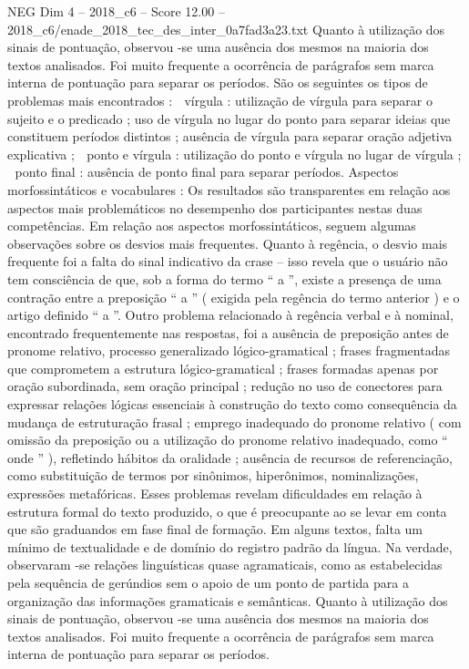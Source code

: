 \begin{textsample}{NEG Dim 4 – 2018\_c6 – Score 12.00 – 2018\_c6/enade\_2018\_tec\_des\_inter\_0a7fad3a23.txt}
Quanto à utilização dos sinais de pontuação, observou -se uma ausência dos mesmos na maioria dos textos analisados.
Foi muito frequente a ocorrência de parágrafos sem marca interna de pontuação para separar os períodos.
São os seguintes os tipos de problemas mais encontrados :  vírgula : utilização de vírgula para separar o sujeito e o predicado ; uso de vírgula no lugar do ponto para separar ideias que constituem períodos distintos ; ausência de vírgula para separar oração adjetiva explicativa ;  ponto e vírgula : utilização do ponto e vírgula no lugar de vírgula ;  ponto final : ausência de ponto final para separar períodos.
Aspectos morfossintáticos e vocabulares : Os resultados são transparentes em relação aos aspectos mais problemáticos no desempenho dos participantes nestas duas competências.
Em relação aos aspectos morfossintáticos, seguem algumas observações sobre os desvios mais frequentes.
Quanto à regência, o desvio mais frequente foi a falta do sinal indicativo da crase – isso revela que o usuário não tem consciência de que, sob a forma do termo “ a ”, existe a presença de uma contração entre a preposição “ a ” ( exigida pela regência do termo anterior ) e o artigo definido “ a ”.
Outro problema relacionado à regência verbal e à nominal, encontrado frequentemente nas respostas, foi a ausência de preposição antes de pronome relativo, processo generalizado lógico-gramatical ; frases fragmentadas que comprometem a estrutura lógico-gramatical ; frases formadas apenas por oração subordinada, sem oração principal ; redução no uso de conectores para expressar relações lógicas essenciais à construção do texto como consequência da mudança de estruturação frasal ; emprego inadequado do pronome relativo ( com omissão da preposição ou a utilização do pronome relativo inadequado, como “ onde ” ), refletindo hábitos da oralidade ; ausência de recursos de referenciação, como substituição de termos por sinônimos, hiperônimos, nominalizações, expressões metafóricas.
Esses problemas revelam dificuldades em relação à estrutura formal do texto produzido, o que é preocupante ao se levar em conta que são graduandos em fase final de formação.
Em alguns textos, falta um mínimo de textualidade e de domínio do registro padrão da língua.
Na verdade, observaram -se relações linguísticas quase agramaticais, como as estabelecidas pela sequência de gerúndios sem o apoio de um ponto de partida para a organização das informações gramaticais e semânticas.
Quanto à utilização dos sinais de pontuação, observou -se uma ausência dos mesmos na maioria dos textos analisados.
Foi muito frequente a ocorrência de parágrafos sem marca interna de pontuação para separar os períodos.

\end{textsample}

